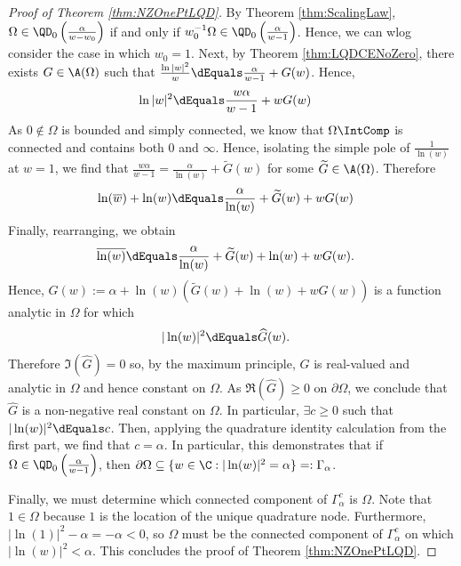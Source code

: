 \documentclass{article}
\numberwithin{equation}{section}
\begin{document}
\begin{proof}[Proof of Theorem \ref{thm:NZOnePtLQD}]
By Theorem \ref{thm:ScalingLaw}, $\Omega\in\QD_0\left(\frac{\alpha}{w-w_0}\right)$ if and only if $w_0^{-1}\Omega\in\QD_0\left(\frac{\alpha}{w-1}\right)$. Hence, we can wlog consider the case in which $w_0=1$. Next, by Theorem \ref{thm:LQDCENoZero}, there exists $G\in\A(\Omega)$ such that $\frac{\ln|w|^2}{w}\dEquals\frac{\alpha}{w-1}+G(w)$. Hence,
\begin{align*}
    \ln|w|^2&\dEquals\dfrac{w\alpha}{w-1}+wG(w)
\end{align*}
As $0\notin\Omega$ is bounded and simply connected, we know that $\Omega\IntComp$ is connected and contains both $0$ and $\infty$. Hence, isolating the simple pole of $\frac{1}{\ln(w)}$ at $w=1$, we find that $\frac{w\alpha}{w-1}=\frac{\alpha}{\ln(w)}+\widetilde{G}(w)$ for some $\widetilde{G}\in\A(\Omega)$. Therefore
\begin{align*}
    \ln(\overline{w})+\ln(w)&\dEquals \frac{\alpha}{\ln(w)}+\widetilde{G}(w)+wG(w)
\end{align*}
Finally, rearranging, we obtain
\begin{align*}
    \overline{\ln(w)}&\dEquals \frac{\alpha}{\ln(w)}+\widetilde{G}(w)+\ln(w)+wG(w).
\end{align*}
Hence, $\widehat{G}(w):=\alpha+\ln(w)(\widetilde{G}(w)+\ln(w)+wG(w))$ is a function analytic in $\Omega$ for which
\begin{align*}
    |\ln(w)|^2&\dEquals \widehat{G}(w).
\end{align*}
Therefore $\Im(\widehat{G})=0$ so, by the maximum principle, $\widehat{G}$ is real-valued and analytic in $\Omega$ and hence constant on $\Omega$. As $\Re(\widehat{G})\geq0$ on $\partial\Omega$, we conclude that $\widehat{G}$ is a non-negative real constant on $\Omega$. In particular, $\exists c\geq0$ such that $|\ln(w)|^2\dEquals c$. Then, applying the quadrature identity calculation from the first part, we find that $c=\alpha$. In particular, this demonstrates that if $\Omega\in\QD_0\left(\frac{\alpha}{w-1}\right)$, then $\partial\Omega\subseteq\{w\in\C:|\ln(w)|^2=\alpha\}=:\Gamma_\alpha$. 

Finally, we must determine which connected component of $\Gamma_\alpha^c$ is $\Omega$. Note that $1\in\Omega$ because $1$ is the location of the unique quadrature node. Furthermore, $|\ln(1)|^2-\alpha=-\alpha<0$, so $\Omega$ must be the connected component of $\Gamma_\alpha^c$ on which $|\ln(w)|^2<\alpha$. This concludes the proof of Theorem \ref{thm:NZOnePtLQD}.
\end{proof}
\end{document}
